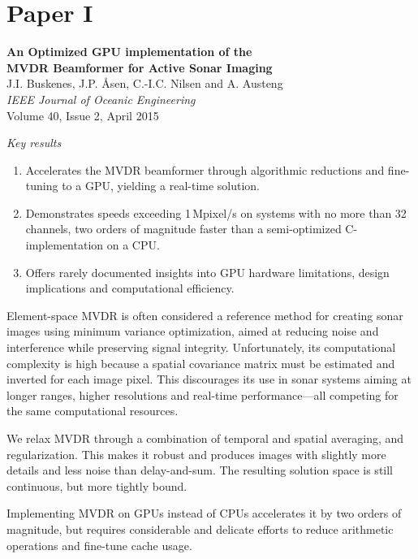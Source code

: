\newpage
\section{Paper I}\label{sec:paperI} %


\textbf{An Optimized GPU implementation of the\\MVDR Beamformer for Active Sonar Imaging}~\cite{Buskenes2014}\\
J.I. Buskenes, J.P. Åsen, C.-I.C. Nilsen and A. Austeng\\
\textit{IEEE Jou\textbf{}rnal of Oceanic Engineering}\\
Volume 40, Issue 2, April 2015

\textit{Key results}
\begin{enumerate}
\item Accelerates the MVDR beamformer through algorithmic reductions and fine-tuning to a GPU, yielding a real-time solution.
\item Demonstrates speeds exceeding 1\,Mpixel/s on systems with no more than 32 channels, two orders of magnitude faster than a semi-optimized C-implementation on a CPU.
\item Offers rarely documented insights into GPU hardware limitations, design implications and computational efficiency.
\end{enumerate}


Element-space MVDR is often considered a reference method for creating sonar images using minimum variance optimization, aimed at reducing noise and interference while preserving signal integrity. Unfortunately, its computational complexity is high because a spatial covariance matrix must be estimated and inverted for each image pixel. This discourages its use in sonar systems aiming at longer ranges, higher resolutions and real-time performance---all competing for the same computational resources. 

We relax MVDR through a combination of temporal and spatial averaging, and regularization. This makes it robust and produces images with slightly more details and less noise than delay-and-sum. The resulting solution space is still continuous, but more tightly bound.

Implementing MVDR on GPUs instead of CPUs accelerates it by two orders of magnitude, but requires considerable and delicate efforts to reduce arithmetic operations and fine-tune cache usage.

